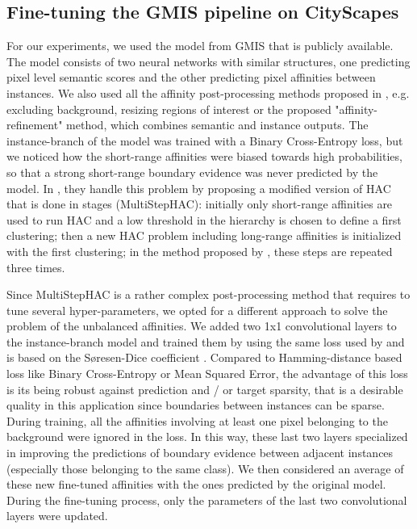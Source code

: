 \subsection{Fine-tuning the GMIS pipeline on CityScapes} \label{sec:appendix_cityscapes}
For our experiments, we used the model from GMIS \cite{liu2018affinity} that is publicly available. 
The model consists of two neural networks with similar structures, one predicting pixel level semantic scores and the other predicting pixel affinities between instances. We also used all the affinity post-processing methods proposed in \cite{liu2018affinity}, e.g. excluding background, resizing regions of interest or the proposed "affinity-refinement" method, which combines semantic and instance outputs. 
The instance-branch of the model was trained with a Binary Cross-Entropy loss, but we noticed how the short-range affinities were biased towards high probabilities, so that a strong short-range boundary evidence was never predicted by the model. In \cite{liu2018affinity}, they handle this problem by proposing a modified version of HAC that is done in stages (MultiStepHAC): initially only short-range affinities are used to run HAC and a low threshold in the hierarchy is chosen to define a first clustering; then a new HAC problem including long-range affinities is  initialized with the first clustering; in the method proposed by \cite{liu2018affinity}, these steps are repeated three times. 

Since MultiStepHAC is a rather complex post-processing method that requires to tune several hyper-parameters, we opted for a different approach to solve the problem of the unbalanced affinities. We added two 1x1 convolutional layers to the instance-branch model and trained them by using the same loss used by \cite{wolf2018mutex} and is based on the S\o resen-Dice coefficient \cite{dice1945measures,sorensen1948method}. Compared to Hamming-distance based loss like Binary Cross-Entropy or Mean Squared Error, the advantage of this loss is its being robust against prediction and / or target sparsity, that is a desirable quality in this application since boundaries between instances can be sparse. 
During training, all the affinities involving at least one pixel belonging to the background were ignored in the loss. In this way, these last two layers specialized in improving the predictions of boundary evidence between adjacent instances (especially those belonging to the same class). We then considered an average of these new fine-tuned affinities with the ones predicted by the original model. During the fine-tuning process, only the parameters of the last two convolutional layers were updated.

